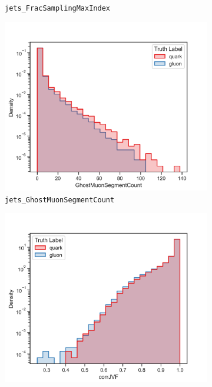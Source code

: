\begin{figure}[!htb]
\begin{subfigure}[t]{0.49\textwidth}
		\caption{\texttt{jets\_FracSamplingMaxIndex}}
		\label{fig:highlevel_7}
	\end{subfigure}
	\begin{subfigure}[t]{0.49\textwidth}
		\includegraphics[width=1\textwidth]{src/plots/distributions/highlevel/jets_GhostMuonSegmentCount.png}
		\caption{\texttt{jets\_GhostMuonSegmentCount}}
		\label{fig:highlevel_8}
	\end{subfigure}
	\begin{subfigure}[t]{0.49\textwidth}
		\includegraphics[width=1\textwidth]{src/plots/distributions/highlevel/jets_JVFCorr.png}

\end{subfigure}
\end{figure}
